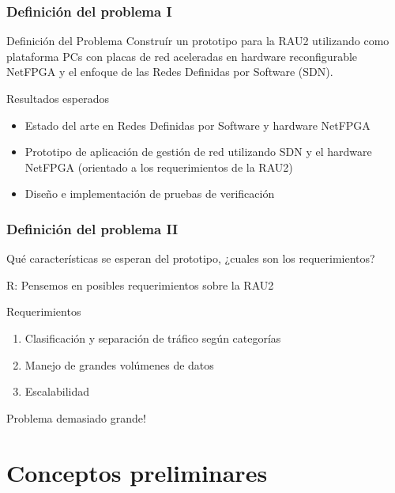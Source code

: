 \documentclass{beamer}
\begin{document}
\begin{frame}
\frametitle{Definición del problema I} 

\begin{block}{Definición del Problema }
Constru\'ir un prototipo para la RAU2 utilizando como plataforma PCs con placas de red aceleradas en hardware reconfigurable NetFPGA y el enfoque de las Redes Definidas por Software (SDN).
\end{block}

\pause
\begin{block}{Resultados esperados}
\begin{itemize}
\item Estado del arte en Redes Definidas por Software y hardware NetFPGA
\pause
\item Prototipo de aplicaci\'on de gesti\'on de red utilizando SDN y el hardware NetFPGA (orientado a  los requerimientos de la RAU2)
\pause
\item Diseño e implementaci\'on de pruebas de verificaci\'on
\end{itemize}
\end{block}

\end{frame}

\begin{frame}
\frametitle{Definición del problema II} 

Qu\'e características se esperan del prototipo, ¿cuales son los requerimientos?

\pause
{\color{blue}R: Pensemos en posibles requerimientos sobre la RAU2}

\pause
\begin{block}{Requerimientos}
\begin{enumerate}[<+->]
\item Clasificaci\'on y separaci\'on de tr\'afico seg\'un categorías
\item Manejo de grandes vol\'umenes de datos
\item Escalabilidad
\end{enumerate}
\end{block}

\pause
Problema demasiado grande!

\end{frame}


\section{Conceptos preliminares} 
\frame{\tableofcontents[currentsection]}
\end{document}
